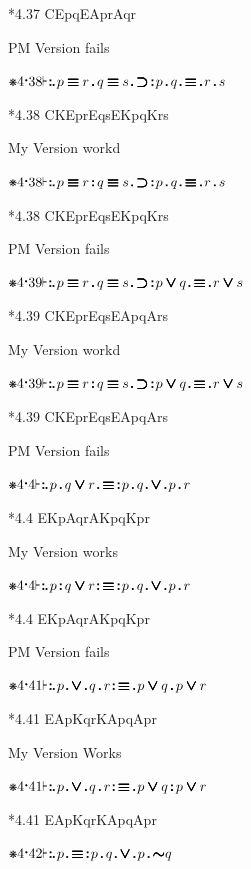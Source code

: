 \documentclass[12pt]{article}
\newcommand{\pmthm}{\mathpunct{\text{\scalebox{.5}[1]{$\boldsymbol\vdash$}}}} %
\newcommand{\pmast}{\text{\resizebox{!}{.75\height}{\ding{107}}}} %
\newcommand{\pmcdot}{\text{\raisebox{.05cm}{$\boldsymbol\cdot$}}} %
\newcommand{\pmd}{\hbox{\rule{.3ex}{.3ex}}} %
\newcommand{\pmdd}{\overset{\pmd}{\pmd}} %
\newcommand{\pmdot}{\mathinner{\pmd}}
\newcommand{\pmdott}{\mathinner{\pmdd}}
\newcommand{\pmdottt}{\mathinner{\pmdd\hspace{1pt}\pmd}}
\newcommand{\pmnot}{\mathord{\ooalign{$\boldsymbol{\sim}\mkern.5mu$\hidewidth\cr$\boldsymbol{\sim}$\cr\hidewidth$\mkern.5mu\boldsymbol{\sim}$}}}
\newcommand{\pmor}{\mathbin{\ooalign{$\boldsymbol{\vee}\mkern.5mu$\hidewidth\cr$\boldsymbol{\vee}$\cr\hidewidth$\mkern.5mu\boldsymbol{\vee}$}}}
\newcommand{\pmimp}{\mathbin{\ooalign{$\boldsymbol{\supset}\mkern.5mu$\hidewidth\cr$\boldsymbol{\supset}$\cr\hidewidth$\mkern.5mu\boldsymbol{\supset}$}}} %
\newcommand{\pmand}{\mathbin{\pmd}}%
\newcommand{\pmandd}{\mathbin{\pmdd}}
\newcommand{\pmiff}{\mathbin{\ooalign{$\boldsymbol{\equiv}\mkern.5mu$\hidewidth\cr$\boldsymbol{\equiv}$\cr\hidewidth$\mkern.5mu\boldsymbol{\equiv}$}}} %
\begin{document}
*4.37 CEpqEAprAqr

PM Version fails

$\pmast 4 \pmcdot 38 \pmthm \pmdottt p \pmiff r \pmand q \pmiff s \pmdot \pmimp \pmdott p \pmand q \pmdot \pmiff \pmdot r \pmand s    $

*4.38 CKEprEqsEKpqKrs

My Version workd

$\pmast 4 \pmcdot 38 \pmthm \pmdottt p \pmiff r \pmandd q \pmiff s \pmdot \pmimp \pmdott p \pmand q \pmdot \pmiff \pmdot r \pmand s    $

*4.38 CKEprEqsEKpqKrs

PM Version fails

$\pmast 4 \pmcdot 39 \pmthm \pmdottt p \pmiff r \pmand q \pmiff s \pmdot \pmimp \pmdott p \pmor q \pmdot \pmiff \pmdot r \pmor s    $

*4.39 CKEprEqsEApqArs

My Version workd

$\pmast 4 \pmcdot 39 \pmthm \pmdottt p \pmiff r \pmandd q \pmiff s \pmdot \pmimp \pmdott p \pmor q \pmdot \pmiff \pmdot r \pmor s    $

*4.39 CKEprEqsEApqArs








PM Version fails

$\pmast 4 \pmcdot 4 \pmthm \pmdottt p \pmand q \pmor r \pmdot \pmiff \pmdott p \pmand q \pmdot \pmor \pmdot p \pmand r      $

*4.4 EKpAqrAKpqKpr

My Version works

$\pmast 4 \pmcdot 4 \pmthm \pmdottt p \pmandd q \pmor r \pmdott \pmiff \pmdott p \pmand q \pmdot \pmor \pmdot p \pmand r      $

*4.4 EKpAqrAKpqKpr



PM Version fails

$\pmast 4 \pmcdot 41 \pmthm \pmdottt p \pmdot \pmor \pmdot q \pmand r \pmdott \pmiff \pmdot p \pmor q \pmand p \pmor r$

*4.41 EApKqrKApqApr

My Version Works

$\pmast 4 \pmcdot 41 \pmthm \pmdottt p \pmdot \pmor \pmdot q \pmand r \pmdott \pmiff \pmdot p \pmor q \pmandd p \pmor r$

*4.41 EApKqrKApqApr

$\pmast 4 \pmcdot 42 \pmthm \pmdottt p \pmdot \pmiff \pmdott p \pmand q \pmdot \pmor \pmdot p \pmand \pmnot q     $
\end{document}
